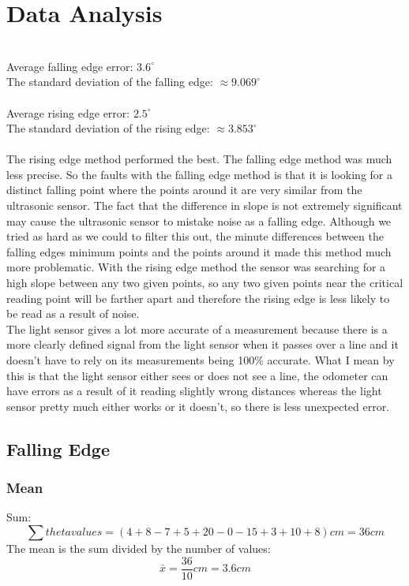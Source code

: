 \documentclass[letterpaper,12pt]{article}
\begin{document}
\section{Data Analysis}{
\mbox{}\\
Average falling edge error: $3.6^{\circ}$\\
The standard deviation of the falling edge: $\approx 9.069^{\circ}$\\
\mbox{}\\
Average rising edge error: $2.5^{\circ}$\\
The standard deviation of the rising edge: $\approx 3.853^{\circ}$\\
\mbox{}\\
The rising edge method performed the best. The falling edge method was much less precise. So the faults with the falling edge method is that it is looking for a distinct falling point where the points around it are very similar from the ultrasonic sensor. The fact that the difference in slope is not extremely significant may cause the ultrasonic sensor to mistake noise as a falling edge. Although we tried as hard as we could to filter this out, the minute differences between the falling edges minimum points and the points around it made this method much more problematic. With the rising edge method the sensor was searching for a high slope between any two given points, so any two given points near the critical reading point will be farther apart and therefore the rising edge is less likely to be read as a result of noise.\\
The light sensor gives a lot more accurate of a measurement because there is a more clearly defined signal from the light sensor when it passes over a line and it doesn't have to rely on its measurements being 100\% accurate. What I mean by this is that the light sensor either sees or does not see a line, the odometer can have errors as a result of it reading slightly wrong distances whereas the light sensor pretty much either works or it doesn't, so there is less unexpected error.\\
\subsection{Falling Edge}
\subsubsection{Mean}
Sum:
\begin{equation}
\sum{theta values} = (4+8-7+5+20-0-15+3+10+8) cm = 36 cm
\end{equation}
The mean is the sum divided by the number of values:
\begin{equation}
\bar{x} = \frac{36}{10} cm = 3.6 cm
\end{equation}
}
\end{document}
